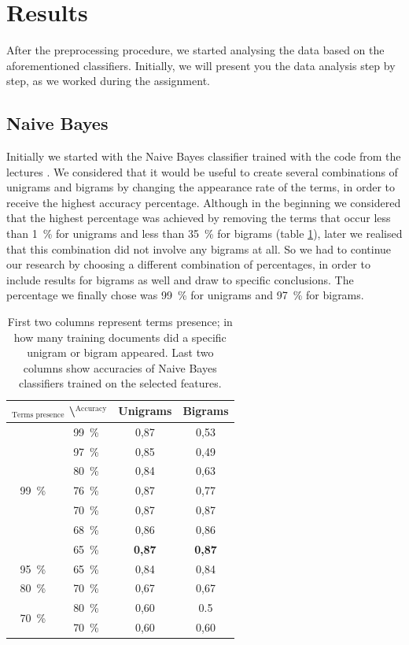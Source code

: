 \documentclass[a4paper,11pt]{article}
\begin{document}
\section{Results}
\label{sec: results}

After the preprocessing procedure, we started analysing the data based on the aforementioned classifiers. Initially, we will present you the data analysis step by step, as we worked during the assignment.

\subsection{Naive Bayes}
\label{subsec: naiveBayes}

Initially we started with the Naive Bayes classifier trained with the code from the lectures \cite{code}. We considered that it would be useful to create several combinations of unigrams and bigrams by changing the appearance rate of the terms, in order to receive the highest accuracy percentage. Although in the beginning we considered that the highest percentage was achieved by removing the terms that occur less than 1~\% for unigrams and less than 35~\% for bigrams (table \ref{tab: naiveBayes}), later we realised that this combination did not involve any bigrams at all. So we had to continue our research by choosing a different combination of percentages, in order to include results for bigrams as well and draw to specific conclusions. The percentage we finally chose was 99~\% for unigrams and 97~\% for bigrams.

\begin{table}[h!]
\centering
\begin{tabular}{c | c || c | c}
\multicolumn{2}{c||}{$_{\text{Terms presence}}$ \textbackslash $^{\text{Accuracy}}$} & Unigrams & Bigrams \\ \hline \hline
\multirow{7}{*}{99~\%} & 99~\% & 0{,}87 & 0{,}53 \\ \cline{2-4}
& 97~\% & 0{,}85 & 0{,}49 \\ \cline{2-4}
& 80~\% & 0{,}84 & 0{,}63 \\ \cline{2-4}
& 76~\% & 0{,}87 & 0{,}77 \\ \cline{2-4}
& 70~\% & 0{,}87 & 0{,}87 \\ \cline{2-4}
& 68~\% & 0{,}86 & 0{,}86 \\ \cline{2-4}
& 65~\% & \textbf{0{,}87} & \textbf{0{,}87} \\ \hline
95~\% & 65~\% & 0{,}84 & 0{,}84 \\ \hline
80~\% & 70~\% & 0{,}67 & 0{,}67 \\ \hline
\multirow{2}{*}{70~\%} & 80~\% & 0{,}60 & 0.5 \\ \cline{2-4}
& 70~\% & 0{,}60 & 0{,}60 \\ 
\end{tabular}
\caption{First two columns represent terms presence; in how many training documents did a specific unigram or bigram appeared. Last two columns show accuracies of Naive Bayes classifiers trained on the selected features.}
\label{tab: naiveBayes}
\end{table}
\end{document}
